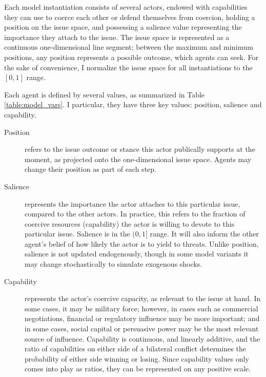 
Each model instantiation consists of several actors, endowed with capabilities they can use to coerce each other or defend themselves from coercion, holding a position on the issue space, and possessing a salience value representing the importance they attach to the issue. The issue space is represented as a continuous one-dimensional line segment; between the maximum and minimum positions, any position represents a possible outcome, which agents can seek. For the sake of convenience, I normalize the issue space for all instantiations to the ${[0, 1]}$ range. 

Each agent is defined by several values, as summarized in Table \ref{table:model_vars}. I particular, they have three key values: position, salience and capability.
\begin{description}
    \item[Position] refers to the issue outcome or stance this actor publically supports at the moment, as projected onto the one-dimensional issue space. Agents may change their position as part of each step.

    \item[Salience] represents the importance the actor attaches to this particular issue, compared to the other actors. In practice, this refers to the fraction of coercive resources (capability) the actor is willing to devote to this particular issue. Salience is in the ${(0, 1]}$ range. It will also inform the other agent's belief of how likely the actor is to yield to threats. Unlike position, salience is not updated endogenously, though in some model variants it may change stochastically to simulate exogenous shocks.

    \item[Capability] represents the actor's coercive capacity, as relevant to the issue at hand. In some cases, it may be military force; however, in cases such as commercial negotiations, financial or regulatory influence may be more important; and in some cases, social capital or persuasive power may be the most relevant source of influence. Capability is continuous, and linearly additive, and the ratio of capabilities on either side of a bilateral conflict determines the probability of either side winning or losing. Since capability values only comes into play as ratios, they can be represented on any positive scale.
\end{description}

